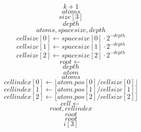 \documentclass{scrreprt}
\begin{document}
\begin{equation}
k+1
\end{equation}
\begin{equation}
atoms
\end{equation}
\begin{equation}
size[3]
\end{equation}
\begin{equation}
depth
\end{equation}
\begin{equation}
atoms, spacesize, depth
\end{equation}
\begin{equation}
cellsize[0] \gets spacesize[0]\cdot2^{-depth}
\end{equation}
\begin{equation}
cellsize[1] \gets spacesize[1]\cdot2^{-depth}
\end{equation}
\begin{equation}
cellsize[2] \gets spacesize[2]\cdot2^{-depth}
\end{equation}
\begin{equation}
root \gets
\end{equation}
\begin{equation}
depth
\end{equation}
\begin{equation}
atom
\end{equation}
\begin{equation}
atoms
\end{equation}
\begin{equation}
cellindex[0] \gets \lfloor atom.pos[0] / cellsize[0] \rfloor
\end{equation}
\begin{equation}
cellindex[1] \gets \lfloor atom.pos[1] / cellsize[1] \rfloor
\end{equation}
\begin{equation}
cellindex[2] \gets \lfloor atom.pos[2] / cellsize[2] \rfloor
\end{equation}
\begin{equation}
cell \gets
\end{equation}
\begin{equation}
root, cellindex
\end{equation}
\begin{equation}
root
\end{equation}
\begin{equation}
root
\end{equation}
\begin{equation}
i[3]
\end{equation}
\end{document}
